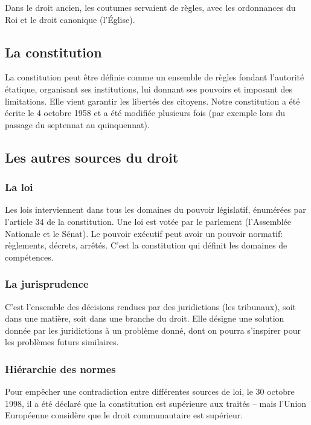 \documentclass[10pt,a4paper]{article}
\begin{document}
Dans le droit ancien, les coutumes servaient de règles, avec les ordonnances du Roi et le droit canonique (l'Église).

\subsection{La constitution}

La constitution peut être définie comme un ensemble de règles fondant l'autorité étatique, organisant ses institutions, lui donnant ses pouvoirs et imposant des limitations. Elle vient garantir les libertés des citoyens. Notre constitution a été écrite le 4 octobre 1958 et a été modifiée plusieurs fois (par exemple lors du passage du septennat au quinquennat).

\subsection{Les autres sources du droit}

\subsubsection{La loi}

Les lois interviennent dans tous les domaines du pouvoir législatif, énumérées par l'article 34 de la constitution. Une loi est votée par le parlement (l'Assemblée Nationale et le Sénat). Le pouvoir exécutif peut avoir un pouvoir normatif: règlements, décrets, arrêtés. C'est la constitution qui définit les domaines de compétences.

\subsubsection{La jurisprudence}

C'est l'ensemble des décisions rendues par des juridictions (les tribunaux), soit dans une matière, soit dans une branche du droit. Elle désigne une solution donnée par les juridictions à un problème donné, dont on pourra s'inspirer pour les problèmes futurs similaires.

\subsubsection{Hiérarchie des normes}

Pour empêcher une contradiction entre différentes sources de loi, le 30 octobre 1998, il a été déclaré que la constitution est supérieure aux traités -- mais l'Union Européenne considère que le droit communautaire est supérieur.
\end{document}
